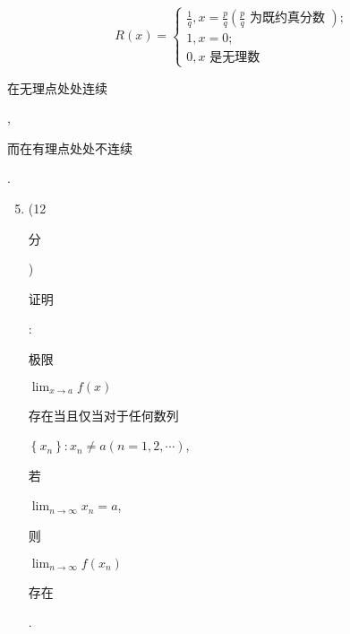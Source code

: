 \documentclass[10pt]{article}
\begin{document}
$$
R(x)=\left\{\begin{array}{l}
\frac{1}{q}, x=\frac{p}{q}\left(\frac{p}{q} \text { 为既约真分数 }\right) ; \\
1, x=0 ; \\
0, x \text { 是无理数 }
\end{array}\right.
$$
\begin{CJK}{UTF8}{mj}在无理点处处连续\end{CJK}, \begin{CJK}{UTF8}{mj}而在有理点处处不连续\end{CJK}.

\begin{enumerate}
  \setcounter{enumi}{4}
  \item (12 \begin{CJK}{UTF8}{mj}分\end{CJK}) \begin{CJK}{UTF8}{mj}证明\end{CJK}: \begin{CJK}{UTF8}{mj}极限\end{CJK} $\lim _{x \rightarrow a} f(x)$ \begin{CJK}{UTF8}{mj}存在当且仅当对于任何数列\end{CJK} $\left\{x_{n}\right\}: x_{n} \neq a(n=1,2, \cdots)$, \begin{CJK}{UTF8}{mj}若\end{CJK} $\lim _{n \rightarrow \infty} x_{n}=a$, \begin{CJK}{UTF8}{mj}则\end{CJK} $\lim _{n \rightarrow \infty} f\left(x_{n}\right)$ \begin{CJK}{UTF8}{mj}存在\end{CJK}.


\end{enumerate}
\end{document}
